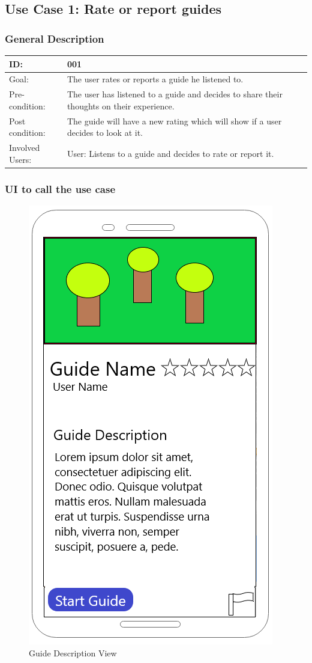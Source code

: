 \documentclass[12pt]{article}
\theoremstyle{definition}
\begin{document}
\subsection{Use Case 1: Rate or report guides}
    \subsubsection{General Description}
    
    \begin{tabular}{|p{.2\linewidth}|p{.65\linewidth}|}
        \hline 
        ID: & 001 \\ \hline
        Goal: & The user rates or reports a guide he listened to. \\ \hline
        Pre-condition: & The user has listened to a guide and decides to share their thoughts on their experience. \\ \hline
        Post condition: & The guide will have a new rating which will show if a user decides to look at it. \\ \hline
        Involved Users: & User: Listens to a guide and decides to rate or report it. \\ \hline
    \end{tabular}
    \pagebreak
    
    \subsubsection{UI to call the use case}
    \begin{figure}[hbt!]
        \centering
        \includegraphics[width=0.35\linewidth]{UIs/GuideView.png}
        \caption{Guide Description View}
        \label{fig:guideview}
    \end{figure}
    
\end{document}
